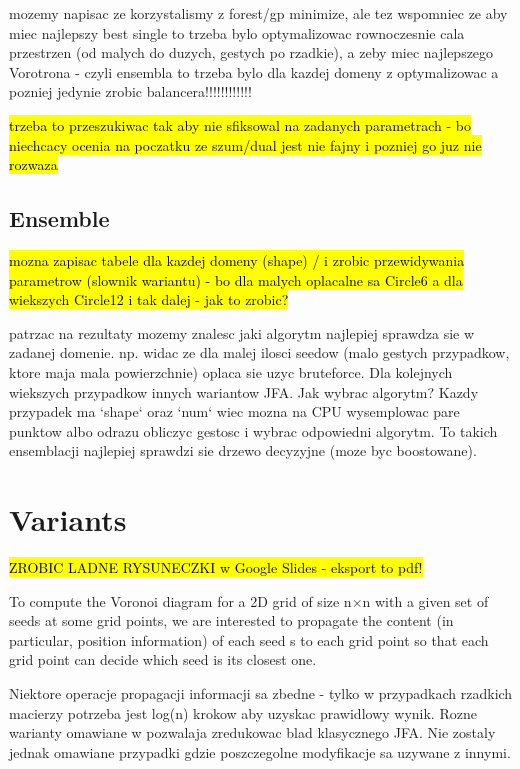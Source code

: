 \documentclass[format=acmsmall,screen,review,authordraft,nonacm]{acmart}
\begin{document}
mozemy napisac ze korzystalismy z forest/gp minimize, ale tez wspomniec ze aby
miec najlepszy best single to trzeba bylo optymalizowac rownoczesnie cala
przestrzen (od malych do duzych, gestych po rzadkie), a zeby miec najlepszego
Vorotrona - czyli ensembla to trzeba bylo dla kazdej domeny z optymalizowac a
pozniej jedynie zrobic balancera!!!!!!!!!!!!

\hl{trzeba to przeszukiwac tak aby nie sfiksowal na zadanych parametrach - bo
niechcacy ocenia na poczatku ze szum/dual jest nie fajny i pozniej go juz nie
rozwaza}

\subsection{Ensemble} %

\hl{mozna zapisac tabele dla kazdej domeny (shape) / i zrobic przewidywania
parametrow (slownik wariantu) - bo dla malych oplacalne sa Circle6 a dla
wiekszych Circle12 i tak dalej - jak to zrobic?}

patrzac na rezultaty mozemy znalesc jaki algorytm najlepiej sprawdza sie w
zadanej domenie. np. widac ze dla malej ilosci seedow (malo gestych przypadkow,
ktore maja mala powierzchnie) oplaca sie uzyc bruteforce. Dla kolejnych
wiekszych przypadkow innych wariantow JFA. Jak wybrac algorytm? Kazdy przypadek ma `shape` oraz `num` wiec mozna na CPU wysemplowac
pare punktow albo odrazu obliczyc gestosc i wybrac odpowiedni algorytm.
To takich ensemblacji najlepiej sprawdzi sie drzewo decyzyjne (moze byc boostowane).

\section{Variants} %

\hl{ZROBIC LADNE RYSUNECZKI w Google Slides - eksport to pdf!}

To compute the Voronoi diagram for a 2D grid of size n×n
with a given set of seeds at some grid points, we are interested to
propagate the content (in particular, position information) of each
seed s to each grid point so that each grid point can decide which
seed is its closest one.

Niektore operacje propagacji informacji sa zbedne - tylko w przypadkach
rzadkich macierzy potrzeba jest log(n) krokow aby uzyskac prawidlowy wynik.
Rozne warianty omawiane w \cite{rong2007variants} pozwalaja zredukowac blad
klasycznego JFA. Nie zostaly jednak omawiane przypadki gdzie poszczegolne
modyfikacje sa uzywane z innymi.
\end{document}
